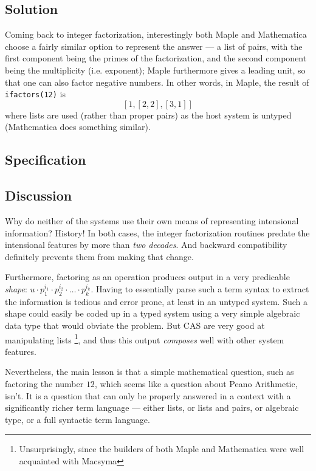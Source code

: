 \documentclass[fleqn]{llncs}
\begin{document}
\subsection{Solution}

Coming back to integer factorization, interestingly both Maple and
Mathematica choose a fairly similar option to represent the answer ---
a list of pairs, with the first component being the primes of the
factorization, and the second component being the multiplicity (i.e.
exponent); Maple furthermore gives a leading unit, so that one can also
factor negative numbers. In other words, in Maple, the result of
\texttt{ifactors(12)} is
\[ \left[ 1, \left[2,2\right], \left[3,1\right]\right] \]
where lists are used (rather than proper pairs) as the host system is
untyped (Mathematica does something similar).

\subsection{Specification}

\subsection{Discussion}

Why do neither of the systems use their own means of representing 
intensional information? History! In both cases, the integer factorization
routines predate the intensional features by more than \emph{two decades}.
And backward compatibility definitely prevents them from making that
change.

Furthermore, factoring as an operation produces output in a very predicable
\emph{shape}: $u\cdot p_1^{i_1} \cdot p_2^{i_2} \cdot \ldots \cdot p_k^{i_k}$.
Having to essentially parse such a term syntax to extract the information is
tedious and error prone, at least in an untyped system. Such a shape could
easily be coded up in a typed system using a very simple algebraic data type
that would obviate the problem. But CAS are very good at manipulating lists%
\footnote{Unsurprisingly, since the builders of both Maple and Mathematica
were well acquainted with Macsyma}, and thus this output \emph{composes}
well with other system features.

Nevertheless, the main lesson is that a simple mathematical question,
such as factoring the number $12$, which seems like a question about
Peano Arithmetic, isn't. It is a question that can only be properly answered
in a context with a significantly richer term language --- either lists,
or lists and pairs, or algebraic type, or a full syntactic term language.
\end{document}
